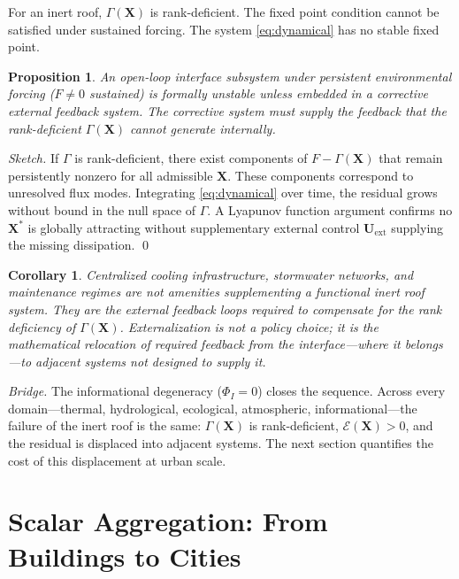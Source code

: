 \documentclass[12pt, a4paper]{article}
\theoremstyle{plain}
\newtheorem{proposition}{Proposition}
\newtheorem{corollary}{Corollary}
\theoremstyle{remark}
\begin{document}
For an inert roof, $\Gamma(\mathbf{X})$ is rank-deficient. The fixed point condition cannot be satisfied under sustained forcing. The system \eqref{eq:dynamical} has no stable fixed point.

\begin{proposition}
\label{prop:control}
An open-loop interface subsystem under persistent environmental forcing ($F \neq 0$ sustained) is formally unstable unless embedded in a corrective external feedback system. The corrective system must supply the feedback that the rank-deficient $\Gamma(\mathbf{X})$ cannot generate internally.
\end{proposition}

\begin{proof}[Sketch]
If $\Gamma$ is rank-deficient, there exist components of $F - \Gamma(\mathbf{X})$ that remain persistently nonzero for all admissible $\mathbf{X}$. These components correspond to unresolved flux modes. Integrating \eqref{eq:dynamical} over time, the residual grows without bound in the null space of $\Gamma$. A Lyapunov function argument confirms no $\mathbf{X}^*$ is globally attracting without supplementary external control $\mathbf{U}_{\text{ext}}$ supplying the missing dissipation. \qed
\end{proof}

\begin{corollary}
Centralized cooling infrastructure, stormwater networks, and maintenance regimes are not amenities supplementing a functional inert roof system. They are the external feedback loops required to compensate for the rank deficiency of $\Gamma(\mathbf{X})$. Externalization is not a policy choice; it is the mathematical relocation of required feedback from the interface---where it belongs---to adjacent systems not designed to supply it.
\end{corollary}

\medskip
\noindent\textit{Bridge.}\; The informational degeneracy ($\Phi_I = 0$) closes the sequence. Across every domain---thermal, hydrological, ecological, atmospheric, informational---the failure of the inert roof is the same: $\Gamma(\mathbf{X})$ is rank-deficient, $\mathcal{E}(\mathbf{X}) > 0$, and the residual is displaced into adjacent systems. The next section quantifies the cost of this displacement at urban scale.

\section{Scalar Aggregation: From Buildings to Cities}
\end{document}
